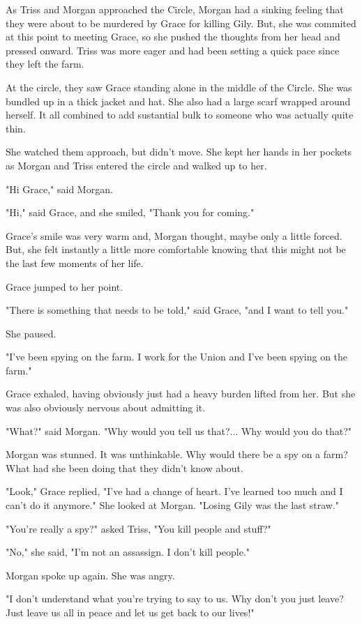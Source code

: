 \documentclass[courier]{sffms}
\begin{document}
As Triss and Morgan approached the Circle, Morgan
had a sinking feeling that they were
about to be murdered by
Grace for killing Gily. But, she was commited
at this point to meeting Grace, so she pushed
the thoughts from her head and pressed onward.
Triss was more eager and had been setting a quick
pace since they left the farm.

At the circle, they saw Grace standing alone in
the middle of the Circle. She was bundled up
in a thick jacket and hat. She also had a large
scarf wrapped around herself. It all combined
to add sustantial bulk to someone who was
actually quite thin.

She watched them approach, but didn't move.
She kept her hands in her pockets as Morgan
and Triss entered the circle and walked up to
her.

"Hi Grace," said Morgan.

"Hi," said Grace, and she smiled, "Thank you
for coming."

Grace's smile was very warm and, Morgan
thought, maybe only a little forced. But, she
felt instantly a little more comfortable knowing
that this might not be the last few moments
of her life.

Grace jumped to her point.

"There is something that needs to be told,"
said Grace, "and I want to tell you."

She paused.

"I've been spying on the farm. I work for the
Union and I've been spying on the farm."

Grace exhaled, having obviously just had
a heavy burden lifted from her. But she was
also obviously nervous about admitting it.

"What?" said Morgan. "Why would you tell
us that?... Why would you do that?"

Morgan was stunned. It was unthinkable.
Why would there be a spy on a farm? What
had she been doing that they didn't know
about.

"Look," Grace replied, "I've had a change of
heart. I've learned too much and I can't
do it anymore." She looked at Morgan.
"Losing Gily was the last straw."

"You're really a spy?" asked Triss, "You kill
people and stuff?"

"No," she said, "I'm not an assassign. I don't
kill people."

Morgan spoke up again. She was angry.

"I don't understand what you're trying to
say to us. Why don't you just leave? Just
leave us all in peace and let us get back to
our lives!"
\end{document}
